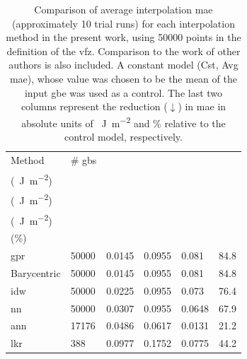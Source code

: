\documentclass[final,twocolumn,12pt]{elsarticle}
\newcommand{\inpt}{input}
\begin{document}
{%
\begin{table}
\centering
\caption{Comparison of average interpolation \gls{mae} (approximately 10 trial runs) for each interpolation method in the present work, using \num{50000} points in the definition of the \gls{vfz}. Comparison to the work of other authors is also included. A constant model (Cst, Avg \gls{mae}), whose value was chosen to be the mean of the \inpt{} \gls{gbe} was used as a control. The last two columns represent the reduction ($\downarrow$) in \gls{mae} in absolute units of \SI{}{\J\per\square\meter} and \% relative to the control model, respectively.}
\label{tab:mae-error-comparison}
\begin{tabular}{@{}llllll@{}}
\toprule
Method &
  \# \glspl{gb} &
  \thead{\gls{mae} \\   (\SI{}{\J\per\square\meter})} &
  \thead{Cst, Avg \gls{mae} \\   (\SI{}{\J\per\square\meter})} &
  \thead{\gls{mae} $\downarrow$ \\   (\SI{}{\J\per\square\meter})} &
  \thead{\gls{mae}   $\downarrow$ \\ (\%)} \\ \midrule
\Gls{gpr}                                            & \num{50000} & \num{0.0145} & \num{0.0955} & \num{0.081}  & \num{84.8} \\
Barycentric                                          & \num{50000} & \num{0.0145} & \num{0.0955} & \num{0.081}  & \num{84.8} \\
\gls{idw}                                            & \num{50000} & \num{0.0225} & \num{0.0955} & \num{0.073}  & \num{76.4} \\
\gls{nn}                                             & \num{50000} & \num{0.0307} & \num{0.0955} & \num{0.0648} & \num{67.9} \\
\gls{ann}   \cite{restrepoUsingArtificialNeural2014} & \num{17176} & \num{0.0486} & \num{0.0617} & \num{0.0131} & \num{21.2} \\
\gls{lkr}   \cite{chesserLearningGrainBoundary2020}  & \num{388}   & \num{0.0977} & \num{0.1752} & \num{0.0775} & \num{44.2} \\ \bottomrule
\end{tabular}
\end{table}


}
\end{document}
